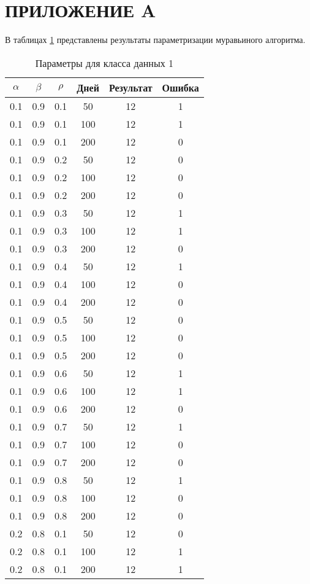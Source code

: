 \chapter*{\hfill{\centering ПРИЛОЖЕНИЕ A}\hfill}
В таблицах \ref{tbl:table_kd1} представлены результаты параметризации муравьиного алгоритма.

\begin{table}[h]
	\begin{center}
        \captionsetup{justification=raggedright,singlelinecheck=off}
		\caption{Параметры для класса данных 1\label{tbl:table_kd1}}
		\begin{tabular}{|c|c|c|c|c|c|}
	\hline
	$\alpha$ & $\beta$ & $\rho$ & Дней & Результат & Ошибка 
	\\ \hline
	0.1 &  0.9 &  0.1 &   50 &    12 &     1 \\
	0.1 &  0.9 &  0.1 &  100 &    12 &     1 \\
	0.1 &  0.9 &  0.1 &  200 &    12 &     0 \\
   \hline
	0.1 &  0.9 &  0.2 &   50 &    12 &     0 \\
	0.1 &  0.9 &  0.2 &  100 &    12 &     0 \\
	0.1 &  0.9 &  0.2 &  200 &    12 &     0 \\
   \hline
	0.1 &  0.9 &  0.3 &   50 &    12 &     1 \\
	0.1 &  0.9 &  0.3 &  100 &    12 &     1 \\
	0.1 &  0.9 &  0.3 &  200 &    12 &     0 \\
   \hline
	0.1 &  0.9 &  0.4 &   50 &    12 &     1 \\
	0.1 &  0.9 &  0.4 &  100 &    12 &     0 \\
	0.1 &  0.9 &  0.4 &  200 &    12 &     0 \\
   \hline
	0.1 &  0.9 &  0.5 &   50 &    12 &     0 \\
	0.1 &  0.9 &  0.5 &  100 &    12 &     0 \\
	0.1 &  0.9 &  0.5 &  200 &    12 &     0 \\
   \hline
	0.1 &  0.9 &  0.6 &   50 &    12 &     1 \\
	0.1 &  0.9 &  0.6 &  100 &    12 &     1 \\
	0.1 &  0.9 &  0.6 &  200 &    12 &     0 \\
   \hline
	0.1 &  0.9 &  0.7 &   50 &    12 &     1 \\
	0.1 &  0.9 &  0.7 &  100 &    12 &     0 \\
	0.1 &  0.9 &  0.7 &  200 &    12 &     0 \\
   \hline
	0.1 &  0.9 &  0.8 &   50 &    12 &     1 \\
	0.1 &  0.9 &  0.8 &  100 &    12 &     0 \\
	0.1 &  0.9 &  0.8 &  200 &    12 &     0 \\
   \hline
	0.2 &  0.8 &  0.1 &   50 &    12 &     0 \\
	0.2 &  0.8 &  0.1 &  100 &    12 &     1 \\
	0.2 &  0.8 &  0.1 &  200 &    12 &     1 \\
   \hline
 		\end{tabular}
	\end{center}
\end{table}
